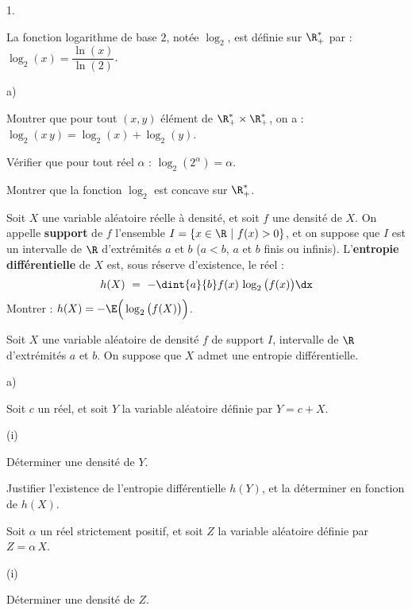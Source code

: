 \documentclass[11pt]{article}%
\begin{document}
\begin{noliste}{1.}
  \setlength{\itemsep}{4mm}
\item La fonction logarithme de base $2$, notée $\log_2$, est définie
  sur $\R_+^*$ par : $\log_2(x) = \dfrac{\ln(x)}{\ln(2)}$.
  \begin{noliste}{a)}
    \setlength{\itemsep}{2mm}
  \item Montrer que pour tout $(x,y)$ élément de $\R_+^* \times
    \R_+^*$, on a : $\log_2(x \, y) = \log_2(x) + \log_2(y)$.
    
  \item Vérifier que pour tout réel $\alpha$ :
    $\log_2\left(2^\alpha\right) = \alpha$.
    
  \item Montrer que la fonction $\log_2$ est concave sur $\R_+^*$.
  \end{noliste}
  
\item Soit $X$ une variable aléatoire réelle à densité, et soit $f$
  une densité de $X$. On appelle {\bf support} de $f$ l'ensemble $I=
  \{x \in \R \ | \ f(x) >0\}$, et on suppose que $I$ est un intervalle
  de $\R$ d'extrémités $a$ et $b$ ($a<b$, $a$ et $b$ finis ou
  infinis). L'{\bf entropie différentielle} de $X$ est, sous réserve
  d'existence, le réel :
  \[
    h(X) \ = \ - \dint{a}{b} f(x) \, \log_2 \big(f(x)\big) \dx
  \]
  Montrer : $h(X) = - \E\Big(\log_2\big(f(X
  )\big)\Big)$.
  
\item Soit $X$ une variable aléatoire de densité $f$ de support $I$,
  intervalle de $\R$ d'extrémités $a$ et $b$. On suppose que $X$ admet
  une entropie différentielle.
  \begin{noliste}{a)}
    \setlength{\itemsep}{2mm}
  \item Soit $c$ un réel, et soit $Y$ la variable aléatoire définie
    par $Y = c+X$.
    \begin{nonoliste}{(i)}
      \setlength{\itemsep}{2mm}
    \item Déterminer une densité de $Y$.
      
    \item Justifier l'existence de l'entropie différentielle $h(Y)$,
      et la déterminer en fonction de $h(X)$.
    \end{nonoliste}
    
  \item Soit $\alpha$ un réel strictement positif, et soit $Z$ la
    variable aléatoire définie par $Z = \alpha \, X$.
    \begin{nonoliste}{(i)}
      \setlength{\itemsep}{2mm}
    \item Déterminer une densité de $Z$.
      

\end{nonoliste}
\end{noliste}
\end{noliste}
\end{document}
